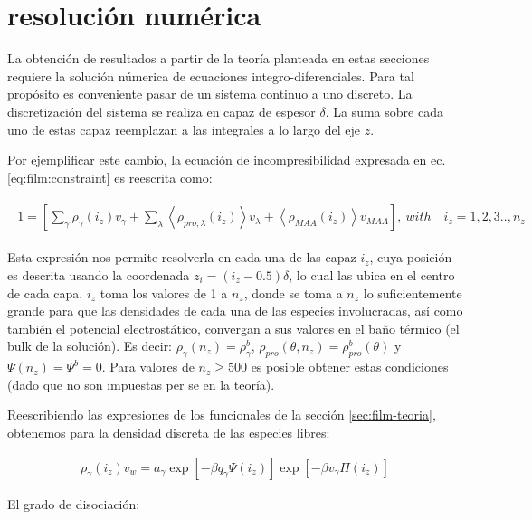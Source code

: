 \section{resoluci\'on num\'erica}\label{sec:film:reso-numerica}

La obtenci\'on de resultados a partir de la teor\'ia planteada en estas secciones requiere la soluci\'on n\'umerica de ecuaciones integro-diferenciales. Para tal prop\'osito es conveniente pasar de un sistema continuo a uno discreto. 
La discretizaci\'on del sistema se realiza en capaz de espesor $\delta$. La suma sobre cada uno de estas capaz reemplazan a las integrales a lo largo del eje $z$.

Por ejemplificar este cambio, la ecuaci\'on de incompresibilidad expresada en ec. \ref{eq:film:constraint} es reescrita como:


\begin{align}
	\begin{aligned}
		1=  {\left[\sum_{\gamma}\rho_\gamma(i_z) v_\gamma + \sum_\lambda{\left<\rho_{pro,\lambda}(i_z)\right>v_\lambda} + \left<\rho_{MAA}(i_z)\right>v_{MAA} \right]},~ with \quad  i_z =1,2,3.., n_z
	\end{aligned}
\label{eq:film:discreto-constraint}
\end{align}

Esta expresi\'on nos permite resolverla en cada una de las capaz $i_z$, cuya posición es descrita usando la coordenada $z_i = (i_z -0.5)\delta$, lo cual las ubica en el centro de cada capa. $i_z$ toma los valores de 1 a $n_z$, donde se toma a $n_z$ lo suficientemente grande para que las densidades de cada una de las especies involucradas, as\'i como tambi\'en el potencial electrost\'atico, convergan a sus valores en el ba\~no t\'ermico (el bulk de la soluci\'on).
Es decir: $\rho_\gamma(n_z) = \rho^b_\gamma$, $\rho_{pro}(\theta,n_z) = \rho^b_{pro}(\theta)$ y $\Psi(n_z) = \Psi^b =0$.
Para valores de $n_z \geq 500$ es posible obtener estas condiciones (dado que no son impuestas per se en la teor\'ia).

Reescribiendo las expresiones de los funcionales de la secci\'on \ref{sec:film-teoria}, obtenemos para la densidad discreta de las especies libres:

\begin{align}
	\rho_\gamma(i_z)v_w = a_\gamma \exp\left[-\beta q_\gamma\Psi(i_z)\right] \exp\left[-\beta v_\gamma\Pi(i_z)\right]
\end{align}


El grado de disociaci\'on:


